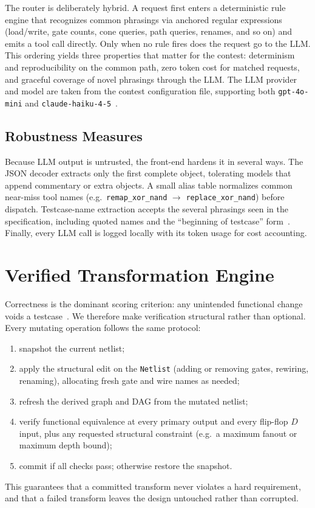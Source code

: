 \documentclass[conference]{IEEEtran}
\begin{document}
The router is deliberately hybrid. A request first enters a deterministic rule
engine that recognizes common phrasings via anchored regular expressions
(load/write, gate counts, cone queries, path queries, renames, and so on) and
emits a tool call directly. Only when no rule fires does the request go to the
LLM. This ordering yields three properties that matter for the contest:
determinism and reproducibility on the common path, zero token cost for matched
requests, and graceful coverage of novel phrasings through the LLM. The LLM
provider and model are taken from the contest configuration file, supporting
both \texttt{gpt-4o-mini} and \texttt{claude-haiku-4-5}~\cite{problemA}.

\subsection{Robustness Measures}
Because LLM output is untrusted, the front-end hardens it in several ways. The
JSON decoder extracts only the first complete object, tolerating models that
append commentary or extra objects. A small alias table normalizes common
near-miss tool names (e.g.\ \texttt{remap\_xor\_nand} $\rightarrow$
\texttt{replace\_xor\_nand}) before dispatch. Testcase-name extraction accepts
the several phrasings seen in the specification, including quoted names and the
``beginning of testcase'' form~\cite{problemA}. Finally, every LLM call is
logged locally with its token usage for cost accounting.

\section{Verified Transformation Engine}
Correctness is the dominant scoring criterion: any unintended functional change
voids a testcase~\cite{problemA}. We therefore make verification structural
rather than optional. Every mutating operation follows the same protocol:
\begin{enumerate}
\item snapshot the current netlist;
\item apply the structural edit on the \texttt{Netlist} (adding or removing
gates, rewiring, renaming), allocating fresh gate and wire names as needed;
\item refresh the derived graph and DAG from the mutated netlist;
\item verify functional equivalence at every primary output and every
flip-flop $D$ input, plus any requested structural constraint (e.g.\ a maximum
fanout or maximum depth bound);
\item commit if all checks pass; otherwise restore the snapshot.
\end{enumerate}
This guarantees that a committed transform never violates a hard requirement,
and that a failed transform leaves the design untouched rather than corrupted.
\end{document}
